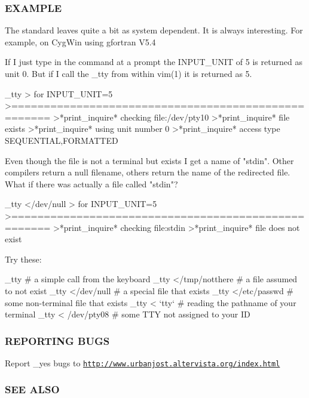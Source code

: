 \subsubsection*{E\+X\+A\+M\+P\+LE}

\begin{DoxyVerb}   The standard leaves quite a bit as system dependent. It is always
   interesting. For example, on CygWin using gfortran V5.4

   If I just type in the command at a prompt the INPUT_UNIT
   of 5 is returned as unit 0. But if I call the _tty from
   within vim(1) it is returned as 5.

     _tty
     > for INPUT_UNIT=5
     >====================================================
     >*print_inquire* checking file:/dev/pty10
     >*print_inquire* file exists
     >*print_inquire* using unit number  0
     >*print_inquire* access type SEQUENTIAL,FORMATTED

   Even though the file is not a terminal but exists
   I get a name of "stdin". Other compilers return a
   null filename, others return the name of the redirected
   file. What if there was actually a file called "stdin"?

     _tty </dev/null
     > for INPUT_UNIT=5
     >====================================================
     >*print_inquire* checking file:stdin
     >*print_inquire* file does not exist

   Try these:

     _tty # a simple call from the keyboard
     _tty </tmp/notthere # a file assumed to not exist
     _tty </dev/null   # a special file that exists
     _tty </etc/passwd # some non-terminal file that exists
     _tty < `tty`      # reading the pathname of your terminal
     _tty < /dev/pty08 # some TTY not assigned to your ID
\end{DoxyVerb}


\subsubsection*{R\+E\+P\+O\+R\+T\+I\+NG B\+U\+GS}

Report \+\_\+yes bugs to \href{http://www.urbanjost.altervista.org/index.html}{\tt http\+://www.\+urbanjost.\+altervista.\+org/index.\+html}

\subsubsection*{S\+EE A\+L\+SO}

